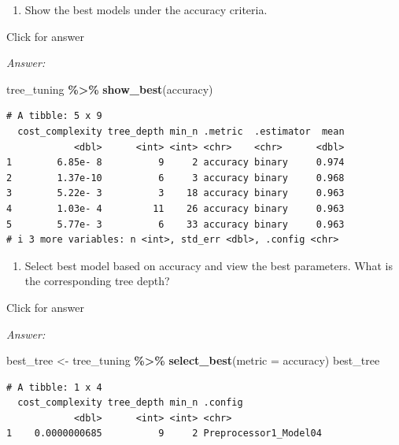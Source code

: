 \documentclass[
]{book}
\newenvironment{Shaded}{\begin{snugshade}}{\end{snugshade}}
\newcommand{\AttributeTok}[1]{\textcolor[rgb]{0.13,0.29,0.53}{#1}}
\newcommand{\FunctionTok}[1]{\textcolor[rgb]{0.13,0.29,0.53}{\textbf{#1}}}
\newcommand{\NormalTok}[1]{#1}
\newcommand{\OtherTok}[1]{\textcolor[rgb]{0.56,0.35,0.01}{#1}}
\newcommand{\SpecialCharTok}[1]{\textcolor[rgb]{0.81,0.36,0.00}{\textbf{#1}}}
\newcommand{\StringTok}[1]{\textcolor[rgb]{0.31,0.60,0.02}{#1}}
\providecommand{\tightlist}{%
  \setlength{\itemsep}{0pt}\setlength{\parskip}{0pt}}
\begin{document}
\begin{enumerate}
\def\labelenumi{\alph{enumi}.}
\setcounter{enumi}{5}
\tightlist
\item
  Show the best models under the accuracy criteria.
\end{enumerate}

Click for answer

\emph{Answer:}

\begin{Shaded}
\begin{Highlighting}[]
\NormalTok{tree\_tuning }\SpecialCharTok{\%\textgreater{}\%} \FunctionTok{show\_best}\NormalTok{(}\StringTok{\textquotesingle{}accuracy\textquotesingle{}}\NormalTok{)}
\end{Highlighting}
\end{Shaded}

\begin{verbatim}
# A tibble: 5 x 9
  cost_complexity tree_depth min_n .metric  .estimator  mean
            <dbl>      <int> <int> <chr>    <chr>      <dbl>
1        6.85e- 8          9     2 accuracy binary     0.974
2        1.37e-10          6     3 accuracy binary     0.968
3        5.22e- 3          3    18 accuracy binary     0.963
4        1.03e- 4         11    26 accuracy binary     0.963
5        5.77e- 3          6    33 accuracy binary     0.963
# i 3 more variables: n <int>, std_err <dbl>, .config <chr>
\end{verbatim}

\begin{enumerate}
\def\labelenumi{\alph{enumi}.}
\setcounter{enumi}{6}
\tightlist
\item
  Select best model based on accuracy and view the best parameters. What is the corresponding tree depth?
\end{enumerate}

Click for answer

\emph{Answer:}

\begin{Shaded}
\begin{Highlighting}[]
\NormalTok{best\_tree }\OtherTok{\textless{}{-}}\NormalTok{ tree\_tuning }\SpecialCharTok{\%\textgreater{}\%}  \FunctionTok{select\_best}\NormalTok{(}\AttributeTok{metric =} \StringTok{\textquotesingle{}accuracy\textquotesingle{}}\NormalTok{)}
\NormalTok{best\_tree}
\end{Highlighting}
\end{Shaded}

\begin{verbatim}
# A tibble: 1 x 4
  cost_complexity tree_depth min_n .config              
            <dbl>      <int> <int> <chr>                
1    0.0000000685          9     2 Preprocessor1_Model04
\end{verbatim}
\end{document}

